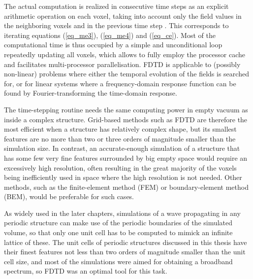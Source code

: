 The actual computation is realized in consecutive time steps as an explicit arithmetic operation on each voxel, taking into account only the field values in the neighboring voxels and in the previous time step \cite{taflove2005book} . This corresponds to iterating equations (\ref{eq_me3}), (\ref{eq_me4}) and (\ref{eq_ce}). %
Most of the computational time is thus occupied by a simple and unconditional loop repeatedly updating all voxels, which allows to fully employ the processor cache and facilitates multi-processor parallelisation. FDTD is applicable to (possibly non-linear) problems where either the temporal evolution of the fields is searched for, or for linear systems where a frequency-domain response function can be found by Fourier-transforming the time-domain response. 

The time-stepping routine needs the same computing power in empty vacuum as inside a complex structure. Grid-based methods such as FDTD are therefore the most efficient when a structure has relatively complex shape, but its smallest features are no more than two or three orders of magnitude smaller than the simulation size. In contrast, an accurate-enough simulation of a structure that has some few very fine features surrounded by big empty space would require an excessively high resolution, often resulting in the great majority of the voxels being inefficiently used in space where the high resolution is not needed. Other methods, %
such as the finite-element method (FEM) or boundary-element method (BEM), would be preferable for such cases.

As widely used in the later chapters,  %
simulations of a wave propagating in any periodic structure can make use of the periodic boundaries of the simulated volume, so that only one unit cell has to be computed to mimick an infinite lattice of these. The unit cells of periodic structures discussed in this thesis have their finest features not less than two orders of magnitude smaller than the unit cell size, and most of the simulations were aimed for obtaining a broadband spectrum, so FDTD was an optimal tool for this task.

